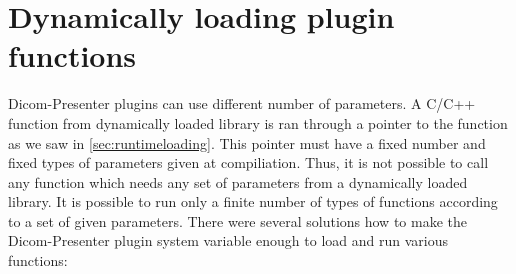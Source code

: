 \begin{comment}
First idea was to use our own way to describe plugin GUI. The first version of plugins system used it's own primitive language. Lines in description file were corresponding to GUI elements. First word of a line determined a type of an element. Other words on the line described element behaviour such as default value, minimum and maximum value or a corresponding function in a library. This own language of GUI description was sufficient but it was unnecessary to force plugin programmer to use our own language. Instead it would be better to use some existing standard.

Other way how to describe a plugin GUI was to use XML language. XML is often use in computer science to pass information in an easily processable form. Moreover Qt library includes extended tools for XML processing.

Last option is to use Qt language for UI description. Qt library uses it's own form to describe application GUI - description is in a special file with a \clist{.ui} extension. It is a strong argument for this option that it is a native way for Qt library to use this langage. Qt library provides a utility for interactive GUI creating. 
\end{comment}



\section*{Dynamically loading plugin functions}

Dicom-Presenter plugins can use different number of parameters. A C/C++ function from dynamically loaded library is ran through a pointer to the function as we saw in \ref{sec:runtimeloading}. This pointer must have a fixed number and fixed types of parameters given at compiliation. Thus, it is not possible to call any function which needs any set of parameters from a dynamically loaded library. It is possible to run only a finite number of types of functions according to a set of given parameters. There were several solutions how to make the Dicom-Presenter plugin system variable enough to load and run various functions:


